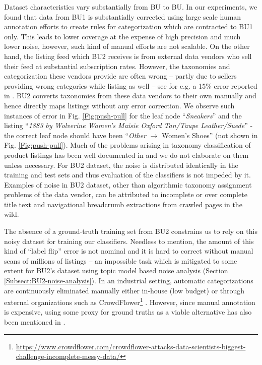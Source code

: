 Dataset characteristics vary substantially from BU to BU.
In our experiments, we found that data from BU1 is substantially corrected using large scale human annotation efforts to create rules for categorization which are contracted to BU1 only.
This leads to lower coverage at the expense of high precision and much lower noise, however, such kind of manual efforts are not scalable.
On the other hand, the listing feed which BU2 receives is from external data vendors who sell their feed at substantial subscription rates. 
However, the taxonomies and categorization these vendors provide are often wrong -- partly due to sellers providing wrong categories while listing as well -- see for e.g. a 15\% error reported in \cite{Shen12}.
BU2 converts taxonomies from these data vendors to their own manually and hence directly maps listings without any error correction.
We observe such instances of error in Fig. \ref{Fig:push-pull} for the leaf node ``\textit{Sneakers}'' and the listing ``\textit{1883 by Wolverine Women's Maisie Oxford Tan/Taupe Leather/Suede}'' - the correct leaf node should have been ``\textit{Other} $\rightarrow$ Women's Shoes'' (not shown in Fig. \ref{Fig:push-pull}).
Much of the problems arising in taxonomy classification of product listings has been well documented in \cite{Sun14, Shen12, Pyo16} and we do not elaborate on them unless necessary.
For BU2 dataset, the noise is distributed identically in the training and test sets and thus evaluation of the classifiers is not impeded by it.
Examples of noise in BU2 dataset, other than algorithmic taxonomy assignment problems of the data vendor, can be attributed to incomplete or over complete title text and navigational breadcrumb extractions from crawled pages in the wild.

The absence of a ground-truth training set from BU2 constrains us to rely on this noisy dataset for training our classifiers. 
Needless to mention, the amount of this kind of ``label flip'' error is not nominal and it is hard to correct without manual scans of millions of listings -- an impossible task which is mitigated to some extent for BU2's dataset using topic model based noise analysis (Section \ref{Subsect:BU2-noise-analysis}).
In an industrial setting, automatic categorizations are continuously eliminated manually either in-house (low budget) or through external organizations such as CrowdFlower\footnote{\scriptsize{\url{https://www.crowdflower.com/crowdflower-attacks-data-scientists-biggest-challenge-incomplete-messy-data/}}} \cite{Sun14}.
However, since manual annotation is expensive, using some proxy for ground truths as a viable alternative has also been mentioned in \cite{Shen12}.


